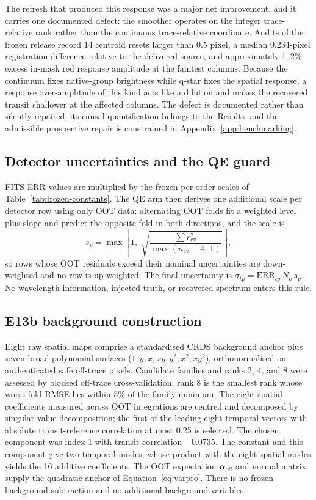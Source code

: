 The refresh that produced this response was a major net improvement, and it
carries one documented defect: the smoother operates on the integer
trace-relative rank rather than the continuous trace-relative coordinate.
Audits of the frozen release record 14 centroid resets larger than 0.5
pixel, a median 0.234-pixel registration difference relative to the
delivered source, and approximately 1--2\% excess in-mask red response
amplitude at the faintest columns. Because the continuum fixes native-group
brightness while q-star fixes the spatial response, a response
over-amplitude of this kind acts like a dilution and makes the recovered
transit shallower at the affected columns. The defect is documented rather
than silently repaired; its causal quantification belongs to the Results,
and the admissible prospective repair is constrained in
Appendix~\ref{app:benchmarking}.

\subsection{Detector uncertainties and the QE guard}

FITS ERR values are multiplied by the frozen per-order scales of
Table~\ref{tab:frozen-constants}. The QE arm then derives one additional
scale per detector row using only OOT data: alternating OOT folds fit a
weighted level plus slope and predict the opposite fold in both directions,
and the scale is
\begin{equation}
 s_p=\max\!\left[1,\;
 \sqrt{\frac{\sum r_{\mathrm{cv}}^2}{\max(n_{\mathrm{cv}}-4,\,1)}}\right],
\end{equation}
so rows whose OOT residuals exceed their nominal uncertainties are
down-weighted and no row is up-weighted. The final uncertainty is
$\sigma_{tp}=\mathrm{ERR}_{tp}\,N_o\,s_p$. No wavelength information,
injected truth, or recovered spectrum enters this rule.

\subsection{E13b background construction}

Eight raw spatial maps comprise a standardised CRDS background anchor plus
seven broad polynomial surfaces
($1, y, x, xy, y^2, x^2, xy^2$), orthonormalised on authenticated safe
off-trace pixels. Candidate families and ranks 2, 4, and 8 were assessed by
blocked off-trace cross-validation; rank 8 is the smallest rank whose
worst-fold RMSE lies within 5\% of the family minimum. The eight spatial
coefficients measured across OOT integrations are centred and decomposed by
singular value decomposition; the first of the leading eight temporal
vectors with absolute transit-reference correlation at most 0.25 is
selected. The chosen component was index 1 with transit correlation
$-0.0735$. The constant and this component give two temporal modes, whose
product with the eight spatial modes yields the 16 additive coefficients.
The OOT expectation $\bm{\alpha}_{\mathrm{off}}$ and normal matrix supply
the quadratic anchor of Equation~\ref{eq:varpro}. There is no frozen
background subtraction and no additional background variables.

